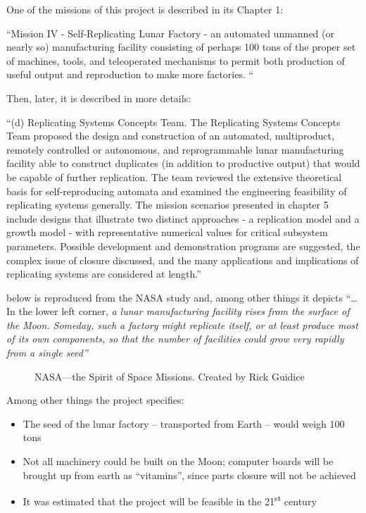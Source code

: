 \hypertarget{RefHeading3154306210128}{}One of the missions of this
project is described in its Chapter 1:

“Mission IV - Self-Replicating Lunar Factory - an
automated unmanned (or nearly so) manufacturing facility consisting of
perhaps 100 tons of the proper set of machines, tools, and teleoperated
mechanisms to permit both production of useful output and reproduction
to make more factories. “

Then, later, it is described in more details:

“(d) Replicating Systems Concepts Team. The
Replicating Systems Concepts Team proposed the design and construction
of an automated, multiproduct, remotely controlled or autonomous, and
reprogrammable lunar manufacturing facility able to construct
duplicates (in addition to productive output) that would be capable of
further replication. The team reviewed the extensive theoretical basis
for self-reproducing automata and examined the engineering feasibility
of replicating systems generally. The mission scenarios presented in
chapter 5 include designs that illustrate two distinct approaches - a
replication model and a growth model - with representative numerical
values for critical subsystem parameters. Possible development and
demonstration programs are suggested, the complex issue of closure
discussed, and the many applications and implications of replicating
systems are considered at length.” 

 below is reproduced from the NASA study and, among other things it
depicts “…In the lower left corner, \textit{a lunar
manufacturing facility rises from the surface of the Moon. Someday,
such a factory might replicate itself, or at least produce most of its
own components, so that the number of facilities could grow very
rapidly from a single seed” }


\begin{figure}
	\label{fig:nasa_spirit}
	\caption{NASA---the Spirit of Space Missions.  Created by Rick Guidice}
\end{figure}

Among other things the project specifies:

\begin{itemize}
\item The seed of the lunar factory – transported from Earth – would
weigh 100 tons
\item Not all machinery could be built on the Moon; computer boards will
be brought up from earth as “vitamins”, since parts closure will not be
achieved
\item It was estimated that the project will be feasible in the
21\textsuperscript{st} century
\end{itemize}

